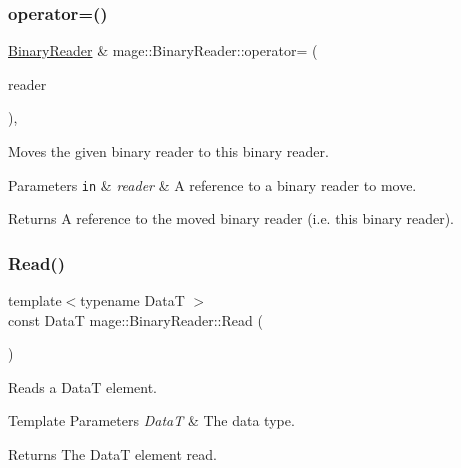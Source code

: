\subsubsection{\texorpdfstring{operator=()}{operator=()}\hspace{0.1cm}{\footnotesize\ttfamily [2/2]}}
{\footnotesize\ttfamily \hyperlink{classmage_1_1_binary_reader}{Binary\+Reader} \& mage\+::\+Binary\+Reader\+::operator= (\begin{DoxyParamCaption}\item[{\hyperlink{classmage_1_1_binary_reader}{Binary\+Reader} \&\&}]{reader }\end{DoxyParamCaption})\hspace{0.3cm}{\ttfamily [default]}, {\ttfamily [noexcept]}}

Moves the given binary reader to this binary reader.


\begin{DoxyParams}[1]{Parameters}
\mbox{\tt in}  & {\em reader} & A reference to a binary reader to move. \\
\hline
\end{DoxyParams}
\begin{DoxyReturn}{Returns}
A reference to the moved binary reader (i.\+e. this binary reader). 
\end{DoxyReturn}
\hypertarget{classmage_1_1_binary_reader_ad914ec3edfef7a9e9976ef706be44b92}{}\label{classmage_1_1_binary_reader_ad914ec3edfef7a9e9976ef706be44b92} 
\subsubsection{\texorpdfstring{Read()}{Read()}}
{\footnotesize\ttfamily template$<$typename DataT $>$ \\
const DataT mage\+::\+Binary\+Reader\+::\+Read (\begin{DoxyParamCaption}{ }\end{DoxyParamCaption})\hspace{0.3cm}{\ttfamily [protected]}}

Reads a {\ttfamily DataT} element.


\begin{DoxyTemplParams}{Template Parameters}
{\em DataT} & The data type. \\
\hline
\end{DoxyTemplParams}
\begin{DoxyReturn}{Returns}
The {\ttfamily DataT} element read. 
\end{DoxyReturn}

